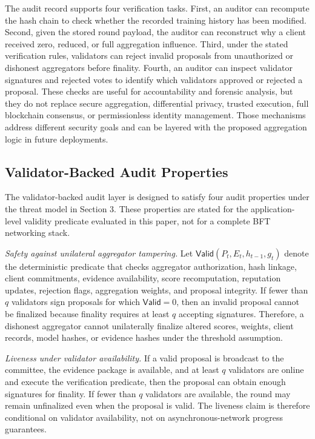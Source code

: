 \documentclass[preprint,12pt]{elsarticle}
\begin{document}
The audit record supports four verification tasks. First, an auditor can recompute the hash chain to check whether the recorded training history has been modified. Second, given the stored round payload, the auditor can reconstruct why a client received zero, reduced, or full aggregation influence. Third, under the stated verification rules, validators can reject invalid proposals from unauthorized or dishonest aggregators before finality. Fourth, an auditor can inspect validator signatures and rejected votes to identify which validators approved or rejected a proposal. These checks are useful for accountability and forensic analysis, but they do not replace secure aggregation, differential privacy, trusted execution, full blockchain consensus, or permissionless identity management. Those mechanisms address different security goals and can be layered with the proposed aggregation logic in future deployments.

\subsection{Validator-Backed Audit Properties}

The validator-backed audit layer is designed to satisfy four audit properties under the threat model in Section 3. These properties are stated for the application-level validity predicate evaluated in this paper, not for a complete BFT networking stack.

\emph{Safety against unilateral aggregator tampering.} Let $\mathsf{Valid}(P_t,E_t,h_{t-1},g_t)$ denote the deterministic predicate that checks aggregator authorization, hash linkage, client commitments, evidence availability, score recomputation, reputation updates, rejection flags, aggregation weights, and proposal integrity. If fewer than $q$ validators sign proposals for which $\mathsf{Valid}=0$, then an invalid proposal cannot be finalized because finality requires at least $q$ accepting signatures. Therefore, a dishonest aggregator cannot unilaterally finalize altered scores, weights, client records, model hashes, or evidence hashes under the threshold assumption.

\emph{Liveness under validator availability.} If a valid proposal is broadcast to the committee, the evidence package is available, and at least $q$ validators are online and execute the verification predicate, then the proposal can obtain enough signatures for finality. If fewer than $q$ validators are available, the round may remain unfinalized even when the proposal is valid. The liveness claim is therefore conditional on validator availability, not on asynchronous-network progress guarantees.
\end{document}
